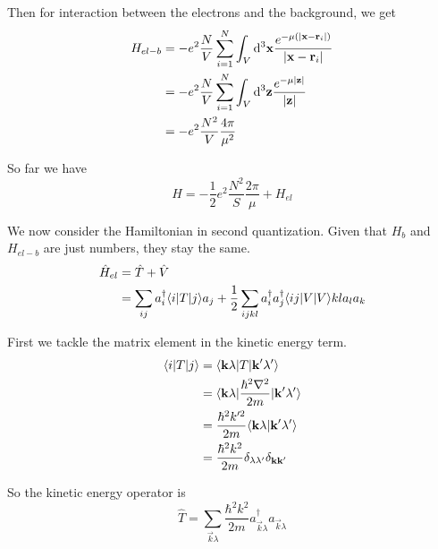 Then for interaction between the electrons and the background, we get
\begin{align*}
H_{el-b} &= -e^2 \frac{N}{V} \sum^N_{i=1} \int_V \operatorname{d \!}{^3\bm{\mathrm{x}}} \frac{e^{-\mu(|\bm{\mathrm{x}}- \bm{\mathrm{r}}_i|)}}{|\bm{\mathrm{x}}- \bm{\mathrm{r}}_i|} \\
&= -e^2 \frac{N}{V} \sum^N_{i=1} \int_V \operatorname{d \!}{^3\bm{\mathrm{z}}} \frac{e^{-\mu |\bm{\mathrm{z}}|}}{|\bm{\mathrm{z}}|} \\
&= -e^2 \frac{N^2}{V}\frac{4\pi}{\mu^2}
\end{align*}

So far we have
\[ H = - \frac{1}{2}e^2 \frac{N^2}{S}\frac{2\pi}{\mu} + H_{el}  \]

We now consider the Hamiltonian in second quantization. Given that $H_b$ and $H_{el-b}$ are just numbers, they stay the same.
\begin{align*}
\hat{H}_{el} &= \hat{T} + \hat{V} \\
&= \sum_{ij}a^\dagger_i \braket[T]{i}{j}a_j + \frac{1}{2}\sum_{ijkl}a^\dagger_i a^\dagger_j \braket[V]{ij}{V}{kl}a_l a_k 
\end{align*}

First we tackle the matrix element in the kinetic energy term.
\begin{align*}
\braket[T]{i}{j} &= \braket[T]{\vec{k}\lambda}{\vec{k}'\lambda'} \\
&= \braket[\frac{\hbar^2\nabla^2}{2m}]{\vec{k}\lambda}{\vec{k}'\lambda'} \\
&= \frac{\hbar^2 k^{\prime 2}}{2m}\braket{\vec{k}\lambda}{\vec{k}'\lambda'} \\
&= \frac{\hbar^2 k^2}{2m} \delta_{\lambda \lambda'}\delta_{\vec{k}\vec{k}'}
\end{align*}

So the kinetic energy operator is
\[ \hat{T} = \sum_{\vec{k}\lambda}\frac{\hbar^2 k^2}{2m}a^\dagger_{\vec{k}\lambda}a_{\vec{k}\lambda} \]

